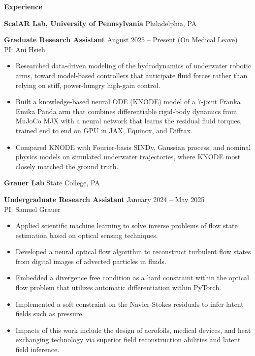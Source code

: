 \begin{center}
    \textbf{Experience}
\end{center}
\textbf{ScalAR Lab, University of Pennsylvania} \hfill Philadelphia, PA

\textbf{Graduate Research Assistant} \hfill August 2025 -- Present (On Medical Leave)\\
PI: Ani Hsieh
\begin{itemize}[noitemsep, topsep=0pt, partopsep=0pt, parsep=0pt]
    \item Researched data-driven modeling of the hydrodynamics of underwater robotic arms, toward model-based controllers that anticipate fluid forces rather than relying on stiff, power-hungry high-gain control.

    \item Built a knowledge-based neural ODE (KNODE) model of a 7-joint Franka Emika Panda arm that combines differentiable rigid-body dynamics from MuJoCo MJX with a neural network that learns the residual fluid torques, trained end to end on GPU in JAX, Equinox, and Diffrax.

    \item Compared KNODE with Fourier-basis SINDy, Gaussian process, and nominal physics models on simulated underwater trajectories, where KNODE most closely matched the ground truth.
\end{itemize}

\vspace{12pt}

\textbf{Grauer Lab} \hfill State College, PA

\textbf{Undergraduate Research Assistant} \hfill January 2024 – May 2025\\
PI: Samuel Grauer
\begin{itemize}[noitemsep, topsep=0pt, partopsep=0pt, parsep=0pt]
    \item Applied scientific machine learning to solve inverse problems of flow state estimation based on optical sensing techniques.
    
    \item Developed a neural optical flow algorithm to reconstruct turbulent flow states from digital images of advected particles in fluids.

    \item Embedded a divergence free condition as a hard constraint within the optical flow problem that utilizes automatic differentiation within PyTorch.

    \item Implemented a soft constraint on the Navier-Stokes residuals to infer latent fields such as pressure.

    \item Impacts of this work include the design of aerofoils, medical devices, and heat exchanging technology via superior field reconstruction abilities and latent field inference.
    
    
\end{itemize}

